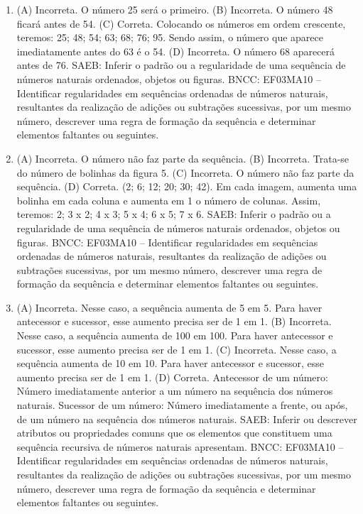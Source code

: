 \begin{enumerate}
\item
(A) Incorreta. O número 25 será o primeiro.
(B) Incorreta. O número 48 ficará antes de 54.
(C) Correta. Colocando os números em ordem crescente, teremos: 25; 48; 54; 63; 68; 76; 95. Sendo assim, o número que aparece imediatamente antes do 63 é o 54.
(D) Incorreta. O número 68 aparecerá antes de 76.
SAEB: Inferir o padrão ou a regularidade de uma sequência de números naturais ordenados, objetos ou figuras.
BNCC: EF03MA10 -- Identificar regularidades em sequências ordenadas de números naturais,
resultantes da realização de adições ou subtrações sucessivas, por um mesmo número,
descrever uma regra de formação da sequência e determinar elementos faltantes ou seguintes.

\item
(A) Incorreta. O número não faz parte da sequência.
(B) Incorreta. Trata-se do número de bolinhas da figura 5.
(C) Incorreta. O número não faz parte da sequência.
(D) Correta. (2; 6; 12; 20; 30; 42). Em cada imagem, aumenta uma bolinha em cada coluna e aumenta em 1 o número de colunas. Assim, teremos: 2; 3 x 2; 4 x 3; 5 x 4; 6 x 5; 7 x 6.
SAEB: Inferir o padrão ou a regularidade de uma sequência de números naturais ordenados, objetos ou figuras.
BNCC: EF03MA10 -- Identificar regularidades em sequências ordenadas de números naturais,
resultantes da realização de adições ou subtrações sucessivas, por um mesmo número,
descrever uma regra de formação da sequência e determinar elementos faltantes ou seguintes.

\item
(A) Incorreta. Nesse caso, a sequência aumenta de 5 em 5. Para haver antecessor e sucessor, esse aumento precisa ser de 1 em 1.
(B) Incorreta. Nesse caso, a sequência aumenta de 100 em 100. Para haver antecessor e sucessor, esse aumento precisa ser de 1 em 1.
(C) Incorreta. Nesse caso, a sequência aumenta de 10 em 10. Para haver antecessor e sucessor, esse aumento precisa ser de 1 em 1.
(D) Correta. Antecessor de um número: Número imediatamente anterior a um número na sequência dos números naturais. Sucessor de um número: Número imediatamente a frente, ou após, de um número na sequência dos números naturais.
SAEB: Inferir ou descrever atributos ou propriedades comuns que os elementos que constituem uma sequência recursiva de números naturais apresentam.
BNCC: EF03MA10 -- Identificar regularidades em sequências ordenadas de números naturais,
resultantes da realização de adições ou subtrações sucessivas, por um mesmo número,
descrever uma regra de formação da sequência e determinar elementos faltantes ou seguintes.
\end{enumerate}


